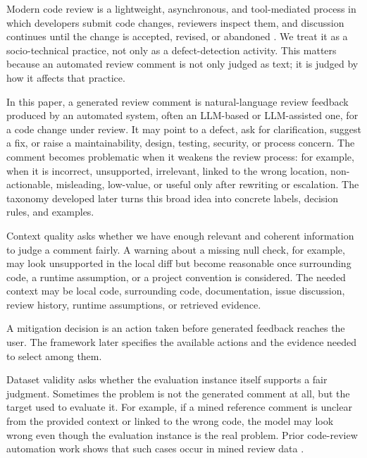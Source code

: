 \documentclass[10pt]{article}
\begin{document}
Modern code review is a lightweight, asynchronous, and tool-mediated process in which developers submit code changes, reviewers inspect them, and discussion continues until the change is accepted, revised, or abandoned \cite{p37_sadowski2018_google_mcr,p38_bacchelli2013_expectations_mcr,p51_davila2021_mcr_slr_taxonomy}. We treat it as a socio-technical practice, not only as a defect-detection activity. This matters because an automated review comment is not only judged as text; it is judged by how it affects that practice.

In this paper, a generated review comment is natural-language review feedback produced by an automated system, often an LLM-based or LLM-assisted one, for a code change under review. It may point to a defect, ask for clarification, suggest a fix, or raise a maintainability, design, testing, security, or process concern. The comment becomes problematic when it weakens the review process: for example, when it is incorrect, unsupported, irrelevant, linked to the wrong location, non-actionable, misleading, low-value, or useful only after rewriting or escalation. The taxonomy developed later turns this broad idea into concrete labels, decision rules, and examples.

Context quality asks whether we have enough relevant and coherent information to judge a comment fairly. A warning about a missing null check, for example, may look unsupported in the local diff but become reasonable once surrounding code, a runtime assumption, or a project convention is considered. The needed context may be local code, surrounding code, documentation, issue discussion, review history, runtime assumptions, or retrieved evidence.

A mitigation decision is an action taken before generated feedback reaches the user. The framework later specifies the available actions and the evidence needed to select among them.

Dataset validity asks whether the evaluation instance itself supports a fair judgment. Sometimes the problem is not the generated comment at all, but the target used to evaluate it. For example, if a mined reference comment is unclear from the provided context or linked to the wrong code, the model may look wrong even though the evaluation instance is the real problem. Prior code-review automation work shows that such cases occur in mined review data \cite{p52_tufano2021_automating_code_review_activities,p53_tufano2024_code_review_automation_strengths_weaknesses}.
\end{document}
